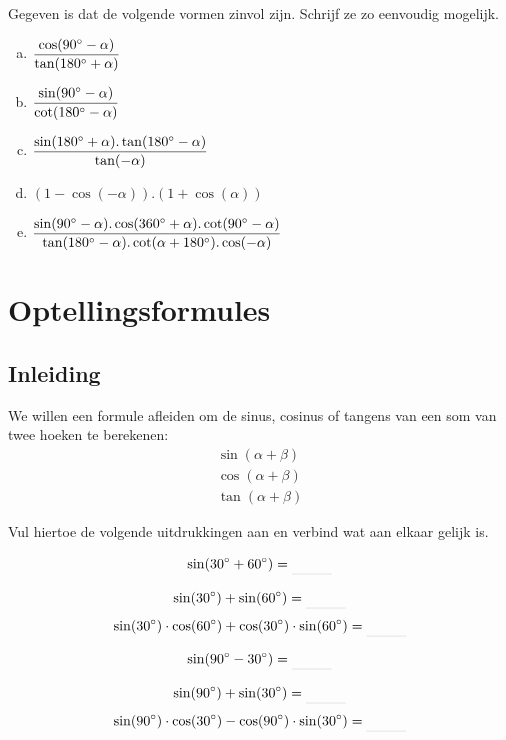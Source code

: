 \documentclass[a4paper,12pt]{article}
\begin{document}
\begin{oefening}
Gegeven is dat de volgende vormen zinvol zijn. Schrijf ze zo eenvoudig mogelijk.
\begin{enumerate}[(a)]
  \itemsep1em
  \item $\dfrac{\cos(90^\circ-\alpha)}{\tan(180^\circ+\alpha)}$
  \item $\dfrac{\sin(90^\circ-\alpha)}{\cot(180^\circ-\alpha)}$
  \item $\dfrac{\sin(180^\circ+\alpha).\tan(180^\circ-\alpha)}{\tan(-\alpha)}$
  \item $(1-\cos(-\alpha)).(1+\cos(\alpha))$
  \item $\dfrac{\sin(90^\circ-\alpha).\cos(360^\circ+\alpha).\cot(90^\circ-\alpha)}{\tan(180^\circ-\alpha).\cot(\alpha+180^\circ).\cos(-\alpha)}$
\end{enumerate}
\end{oefening}

\newpage
\section{Optellingsformules}

\subsection{Inleiding}
We willen een formule afleiden om de sinus, cosinus of tangens van een som van twee hoeken te berekenen:
\begin{align*}
  \sin(\alpha + \beta)\\
  \cos(\alpha + \beta)\\
  \tan(\alpha+\beta)
\end{align*}

Vul hiertoe de volgende uitdrukkingen aan en verbind wat aan elkaar gelijk is.

\begin{minipage}{0.4\textwidth}
  $$\sin(30\degree + 60\degree)=\arule{1cm}$$
\end{minipage}
\begin{minipage}{0.5\textwidth}
  $$\sin(30\degree) + \sin(60\degree)=\arule{1cm}$$
  $$\sin(30\degree)\cdot\cos(60\degree)+\cos(30\degree)\cdot\sin(60\degree)=\arule{1cm}$$
\end{minipage}

\begin{minipage}{0.4\textwidth}
  $$\sin(90\degree - 30\degree)=\arule{1cm}$$
\end{minipage}
\begin{minipage}{0.5\textwidth}
  $$\sin(90\degree) + \sin(30\degree)=\arule{1cm}$$
  $$\sin(90\degree)\cdot\cos(30\degree)-\cos(90\degree)\cdot\sin(30\degree)=\arule{1cm}$$
\end{minipage}
\end{document}
